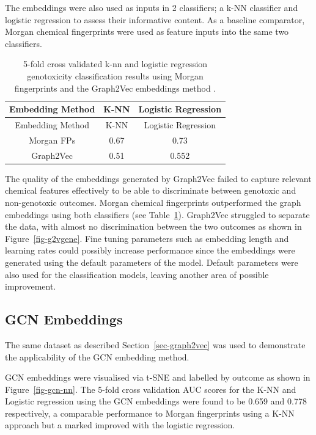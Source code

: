 \documentclass[
  super,
  preprint,
  3p]{elsarticle}
\begin{document}
The embeddings were also used as inputs in 2 classifiers; a k-NN
classifier and logistic regression to assess their informative content.
As a baseline comparator, Morgan chemical fingerprints were used as
feature inputs into the same two classifiers.

\begin{longtable}[]{@{}ccc@{}}
\caption{5-fold cross validated k-nn and logistic regression
genotoxicity classification results using Morgan fingerprints and the
Graph2Vec embeddings method .}\label{tbl-graph2vec}\tabularnewline
\toprule\noalign{}
Embedding Method & K-NN & Logistic Regression \\
\midrule\noalign{}
\endfirsthead
\toprule\noalign{}
Embedding Method & K-NN & Logistic Regression \\
\midrule\noalign{}
\endhead
\bottomrule\noalign{}
\endlastfoot
Morgan FPs & 0.67 & 0.73 \\
Graph2Vec & 0.51 & 0.552 \\
\end{longtable}

The quality of the embeddings generated by Graph2Vec failed to capture
relevant chemical features effectively to be able to discriminate
between genotoxic and non-genotoxic outcomes. Morgan chemical
fingerprints outperformed the graph embeddings using both classifiers
(see Table~\ref{tbl-graph2vec}). Graph2Vec struggled to separate the
data, with almost no discrimination between the two outcomes as shown in
Figure~\ref{fig-g2vgene}. Fine tuning parameters such as embedding
length and learning rates could possibly increase performance since the
embeddings were generated using the default parameters of the model.
Default parameters were also used for the classification models, leaving
another area of possible improvement.

\subsection{GCN Embeddings}\label{gcn-embeddings}

The same dataset as described Section~\ref{sec-graph2vec} was used to
demonstrate the applicability of the GCN embedding method.

GCN embeddings were visualised via t-SNE and labelled by outcome as
shown in Figure~\ref{fig-gcn-nn}. The 5-fold cross validation AUC scores
for the K-NN and Logistic regression using the GCN embeddings were found
to be 0.659 and 0.778 respectively, a comparable performance to Morgan
fingerprints using a K-NN approach but a marked improved with the
logistic regression.
\end{document}
